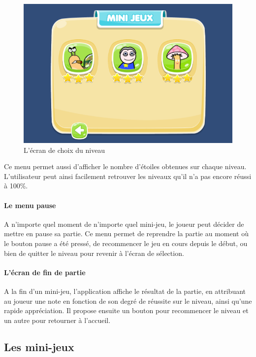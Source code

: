 \begin{figure}[H]\centering
  \includegraphics[scale=0.6]{./img/resultat_niveaux.png}
  \caption{L'écran de choix du niveau}
  \label{analytics}
\end{figure}

Ce menu permet aussi d'afficher le nombre d'étoiles obtenues sur chaque niveau. L'utilisateur peut ainsi facilement retrouver les niveaux qu'il n'a pas encore réussi à 100\%.

\paragraph{Le menu pause}

A n'importe quel moment de n'importe quel mini-jeu, le joueur peut décider de mettre en pause sa partie. Ce menu permet de reprendre la partie au moment où le bouton pause a été pressé, de recommencer le jeu en cours depuis le début, ou bien de quitter le niveau pour revenir à l'écran de sélection.

\paragraph{L'écran de fin de partie}

A la fin d'un mini-jeu, l'application affiche le résultat de la partie, en attribuant au joueur une note en fonction de son degré de réussite sur le niveau, ainsi qu'une rapide appréciation. Il propose ensuite un bouton pour recommencer le niveau et un autre pour retourner à l'accueil.

\subsection{Les mini-jeux}

